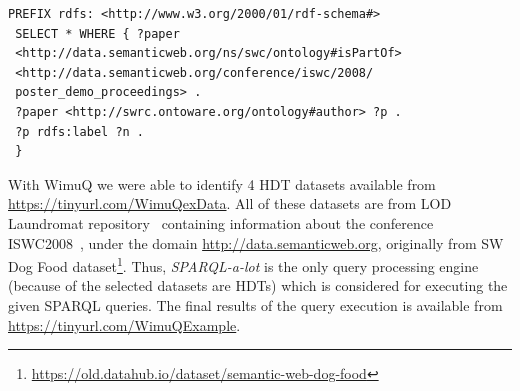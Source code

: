\begin{lstlisting}[language=SPARQL]
 PREFIX rdfs: <http://www.w3.org/2000/01/rdf-schema#>
 SELECT * WHERE { ?paper 
 <http://data.semanticweb.org/ns/swc/ontology#isPartOf> 
 <http://data.semanticweb.org/conference/iswc/2008/
 poster_demo_proceedings> .
 ?paper <http://swrc.ontoware.org/ontology#author> ?p .
 ?p rdfs:label ?n .
 }
\end{lstlisting}

 






With WimuQ we were able to identify 4 HDT datasets available from 
\url{https://tinyurl.com/WimuQexData}. All of these datasets are
from LOD Laundromat repository~\cite{beek2014lod} containing information about the conference ISWC2008~\cite{sheth2008semantic}, under the domain \url{http://data.semanticweb.org}, originally from SW Dog Food dataset\footnote{\url{https://old.datahub.io/dataset/semantic-web-dog-food}}. Thus, \emph{SPARQL-a-lot} is the only query processing engine (because of the selected datasets are HDTs) which is considered for executing the given SPARQL queries. The final results of the query execution is available from \url{https://tinyurl.com/WimuQExample}. 



